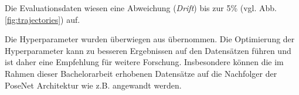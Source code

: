 Die Evaluationsdaten wiesen eine Abweichung (\textit{Drift}) bis zur 5\% (vgl. Abb. \ref{fig:trajectories}) auf.
%






Die Hyperparameter wurden überwiegen aus \citet{acharyaBIMPoseNetIndoorCamera2019} übernommen. Die Optimierung der Hyperparameter kann zu besseren Ergebnissen auf den Datensätzen führen und ist daher eine Empfehlung für weitere Forschung. Insbesondere können die im Rahmen dieser Bachelorarbeit erhobenen Datensätze auf die Nachfolger der PoseNet Architektur wie z.B. \cite{kendallModellingUncertaintyDeep2016, walchImageBasedLocalizationUsing2017, kendallGeometricLossFunctions2017, clarkVidLocDeepSpatioTemporal2017} angewandt werden.


% 

